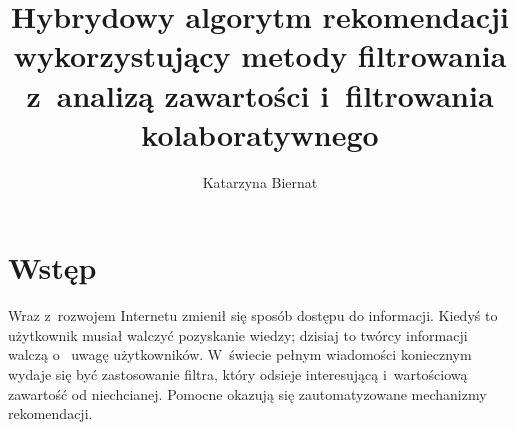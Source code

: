 \documentclass[twoside]{iisthesis}
\newcommand{\myfigure}[1]{%
\addcontentsline{figu}{myfigure}{\protect\numberline{\thefigure}#1}\par}
\begin{document}
\newcommand{\resultChart}[7][140]{
\def\dataS{{#2}}
	\begin{figure}[H]
	
\centering

\begin{center}
\begin{tikzpicture}
 
\begin{axis}[
ybar,
bar width=20,
legend style={at={(0.5,-0.25)},
anchor=north,legend columns=-1},
ylabel={Wartość miary},
symbolic x coords={\dataS},
xtick=data,
height=  {#1},
width=0.8\textwidth,
ymin=0, ytick={0,0.5,1},
ymax=1.5,
nodes near coords,
nodes near coords align={vertical},
]
\addplot coordinates { (\dataS,{#3}) };
\addplot coordinates {(\dataS,{#4}) };
\addplot coordinates { (\dataS,{#5}) };
\legend{Recall,Precission,F1-Score}
\end{axis}
\end{tikzpicture}
\end{center}
\caption{{#6}}
\myfigure{{#6}}
\label{{#7}}
\end{figure}
}


%
\nocite{*}
\title{ Hybrydowy algorytm rekomendacji wykorzystujący metody filtrowania z~analizą zawartości i~filtrowania kolaboratywnego }
\author{Katarzyna Biernat }

\date{\number\the\year}




\maketitle
\textpages


\graphicspath{ {img/} }

 \chapter{Wstęp}
	 Wraz z~rozwojem Internetu zmienił się sposób dostępu do informacji. Kiedyś to użytkownik musiał walczyć pozyskanie wiedzy; dzisiaj to twórcy informacji walczą o~ uwagę użytkowników. W~świecie pełnym wiadomości koniecznym wydaje się być zastosowanie filtra, który odsieje interesującą  i~wartościową zawartość od niechcianej. Pomocne okazują się zautomatyzowane mechanizmy rekomendacji.
	 
\end{document}
